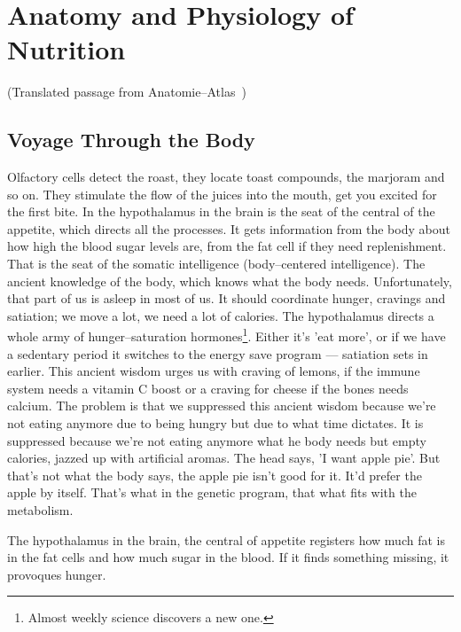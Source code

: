 \documentclass[../main.tex]{subfiles}
\begin{document}
\section{Anatomy and Physiology of Nutrition}
(Translated passage from Anatomie--Atlas~\cite{AAtlas})
\subsection{Voyage Through the Body}
Olfactory cells detect the roast, they locate toast compounds, the marjoram and so on.
They stimulate the flow of the juices into the mouth, get you excited for the first bite.
In the hypothalamus in the brain is the seat of the central of the appetite, which directs all the processes.
It gets information from the body about how high the blood sugar levels are, from the fat cell if they need replenishment.
That is the seat of the somatic intelligence (body--centered intelligence).
The ancient knowledge of the body, which knows what the body needs.
Unfortunately, that part of us is asleep in most of us.
It should coordinate hunger, cravings and satiation; we move a lot, we need a lot of calories.
The hypothalamus directs a whole army of hunger--saturation hormones\footnote{Almost weekly science discovers a new one.}.
Either it's 'eat more', or if we have a sedentary period it switches to the energy save program --- satiation sets in earlier.
This ancient wisdom urges us with craving of lemons, if the immune system needs a vitamin C boost or a craving for cheese if the bones needs calcium.
The problem is that we suppressed this ancient wisdom because we're not eating anymore due to being hungry but due to what time dictates.
It is suppressed because we're not eating anymore what he body needs but empty calories, jazzed up with artificial aromas.
The head says, 'I want apple pie'. But that's not what the body says, the apple pie isn't good for it. It'd prefer the apple by itself.
That's what in the genetic program, that what fits with the metabolism.

The hypothalamus in the brain, the central of appetite registers how much fat is in the fat cells and how much sugar in the blood. If it finds something missing, it provoques hunger.
\end{document}
